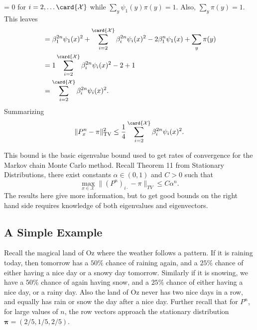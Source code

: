 \documentclass[12pt]{article}
\begin{document}
\rangle = 0 \) for \( i = 2, \dots \card{\mathcal{X}} \) while \( \sum_y
\psi_1(y) \pi(y) = 1 \).  Also, \( \sum_y \pi(y) = 1 \).  This leaves
\begin{align*}
    & = \beta_1^{2n} \psi_1(x)^2 + \sum\limits_{i=2}^{\card{\mathcal{X}}}
    \beta_i^{2n} \psi_i(x)^2 - 2 \beta_1^n \psi_1(x) + \sum\limits_y \pi
    (y) \\
    &= 1 \sum\limits_{i=2}^{\card{\mathcal{X}}} \beta_i^{2n} \psi_i(x)^2
    - 2 + 1 \\
    &= \sum\limits_{i=2}^{\card{\mathcal{X}}} \beta_i^{2n} \psi_i(x)^2.
\end{align*}
Summarizing
\begin{equation}
    \|P^n_x - \pi \|^2_{\text{TV}} \le \frac{1}{4} \sum\limits_{i=2}^{\card
    {\mathcal{X}}} \beta_i^{2n} \psi_i(x)^2.%
    \label{eq:montecarlo:bound}
\end{equation}

This bound is the basic eigenvalue bound used to get rates of
convergence for the Markov chain Monte Carlo method.  Recall Theorem 11
from Stationary Distributions, there exist constants \( \alpha \in (0,1)
\) and \( C > 0 \) such that
\[
    \max_{x \in \mathcal{X}} \| (P^n)_{i \cdot} - \pi \|_{TV} \le C
    \alpha^n.
\] The results here give more information, but to get good bounds on the
right hand side requires knowledge of both eigenvalues and eigenvectors.

\subsection*{A Simple Example}

Recall the magical land of Oz where the weather follows a pattern.  If
it is raining today, then tomorrow has a \( 50\% \) chance of raining
again, and a \( 25\% \) chance of either having a nice day or a snowy
day tomorrow.  Similarly if it is snowing, we have a \( 50\% \) chance
of again having snow, and a \( 25\% \) chance of either having a nice
day, or a rainy day.  Also the land of Oz never has two nice days in a
row, and equally has rain or snow the day after a nice day.  Further
recall that for \( P^n \), for large values of \( n \), the row vectors
approach the stationary distribution \( \mathbf{\pi}=(2/5,1/5,2/5) \).
\end{document}
